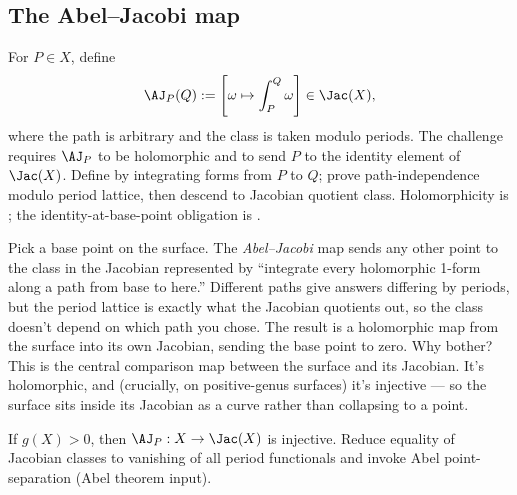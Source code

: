 \subsection{The Abel--Jacobi map}

\begin{definition}
\label{def:abel-jacobi}
For \(P\in X\), define
\[
  \AJ_P(Q) :=
    \left[ \omega \mapsto \int_{P}^{Q}\omega \right] \in \Jac(X),
\]
where the path is arbitrary and the class is taken modulo periods. The
challenge requires \(\AJ_P\) to be holomorphic and to send \(P\) to the
identity element of \(\Jac(X)\).
\leanok
\proofplan
Define by integrating forms from \(P\) to \(Q\); prove path-independence modulo
period lattice, then descend to Jacobian quotient class. Holomorphicity is
; the identity-at-base-point obligation is
.
\end{definition}

\begin{layman}
Pick a base point on the surface. The \emph{Abel--Jacobi} map sends
any other point to the class in the Jacobian represented by ``integrate
every holomorphic 1-form along a path from base to here.'' Different
paths give answers differing by periods, but the period lattice is
exactly what the Jacobian quotients out, so the class doesn't depend
on which path you chose. The result is a holomorphic map from the
surface into its own Jacobian, sending the base point to zero. Why
bother? This is the central comparison map between the surface and
its Jacobian. It's holomorphic, and (crucially, on positive-genus
surfaces) it's injective --- so the surface sits inside its Jacobian as a
curve rather than collapsing to a point.
\end{layman}

\begin{theorem}
\label{thm:abel-jacobi-injective}
If \(g(X)>0\), then \(\AJ_P : X\to \Jac(X)\) is injective.
\leanok
\proofplan
Reduce equality of Jacobian classes to vanishing of all period functionals and
invoke Abel point-separation (Abel theorem input).
\end{theorem}

